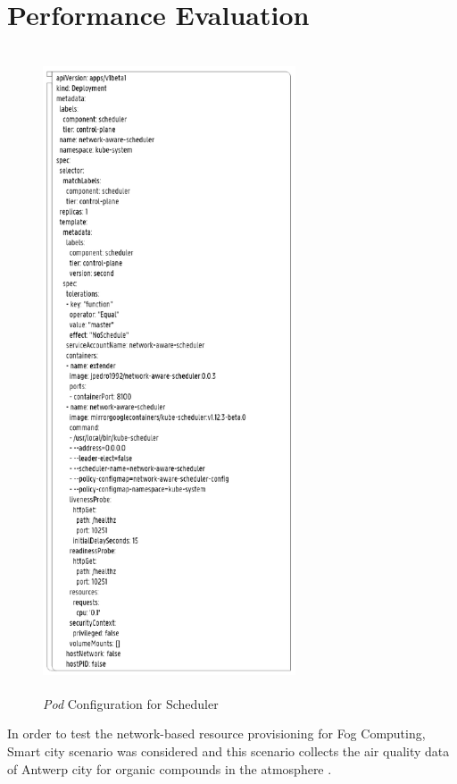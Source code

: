 \section{Performance Evaluation}
\label{sec:Performance_eval}
\begin{figure}
  \centering
  \includegraphics[width=75mm, height=19cm]{figures/mlcn-k8s-pod-config.pdf}
  \caption{\emph{Pod} Configuration for Scheduler\cite{Santos2019}}
  \label{fig:k8s-pod-config}
\end{figure}
In order to test the network-based resource provisioning for Fog Computing, Smart city scenario was considered and this scenario collects the air quality data of Antwerp city for organic compounds in the atmosphere \cite{Santos2019}.
\vspace{-0.10cm}
